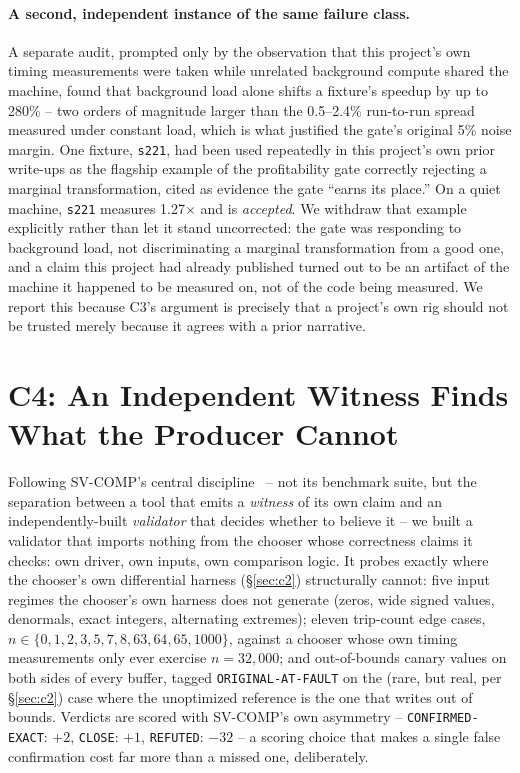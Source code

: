 \documentclass[sigconf,review,anonymous]{acmart}
\begin{document}
\paragraph{A second, independent instance of the same failure class.} A
separate audit, prompted only by the observation that this project's own
timing measurements were taken while unrelated background compute shared
the machine, found that background load alone shifts a fixture's speedup by
up to 280\% -- two orders of magnitude larger than the 0.5--2.4\% run-to-run
spread measured under constant load, which is what justified the gate's
original 5\% noise margin. One fixture, \texttt{s221}, had been used
repeatedly in this project's own prior write-ups as the flagship example of
the profitability gate correctly rejecting a marginal transformation, cited
as evidence the gate ``earns its place.'' On a quiet machine, \texttt{s221}
measures 1.27$\times$ and is \emph{accepted}. We withdraw that example
explicitly rather than let it stand uncorrected: the gate was responding to
background load, not discriminating a marginal transformation from a good
one, and a claim this project had already published turned out to be an
artifact of the machine it happened to be measured on, not of the code being
measured. We report this because C3's argument is precisely that a
project's own rig should not be trusted merely because it agrees with a
prior narrative.

\section{C4: An Independent Witness Finds What the Producer Cannot}
\label{sec:c4}

Following SV-COMP's central discipline~\cite{svcomp-witnesses} -- not its
benchmark suite, but the separation between a tool that emits a
\emph{witness} of its own claim and an independently-built
\emph{validator} that decides whether to believe it -- we built a validator
that imports nothing from the chooser whose correctness claims it checks:
own driver, own inputs, own comparison logic. It probes exactly where the
chooser's own differential harness (\S\ref{sec:c2}) structurally cannot:
five input regimes the chooser's own harness does not generate (zeros, wide
signed values, denormals, exact integers, alternating extremes); eleven
trip-count edge cases, $n \in \{0,1,2,3,5,7,8,63,64,65,1000\}$, against a
chooser whose own timing measurements only ever exercise $n=32{,}000$; and
out-of-bounds canary values on both sides of every buffer, tagged
\texttt{ORIGINAL-AT-FAULT} on the (rare, but real, per \S\ref{sec:c2}) case
where the unoptimized reference is the one that writes out of bounds.
Verdicts are scored with SV-COMP's own asymmetry --
\texttt{CONFIRMED-EXACT}: $+2$, \texttt{CLOSE}: $+1$, \texttt{REFUTED}:
$-32$ -- a scoring choice that makes a single false confirmation cost far
more than a missed one, deliberately.
\end{document}
